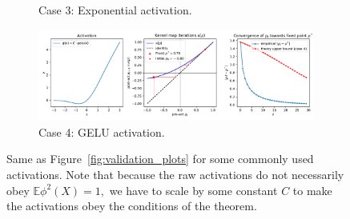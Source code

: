 \documentclass[twoside]{article}
\newcommand{\E}{\mathbb{E}}
\theoremstyle{definition}
\begin{document}
\begin{figure}[ht!]
\begin{subfigure}[b]{0.7\textwidth}
        \caption{\small Case 3: Exponential activation.} 
    \end{subfigure}
    \hfill
    \begin{subfigure}[b]{0.7\textwidth}
        \centering
        \includegraphics[width=\textwidth]{./kernel_map_convergence_case_3_gelu.pdf}
        \caption{\small Case 4: GELU activation.}
    \end{subfigure}
    \caption{\small Same as Figure~\ref{fig:validation_plots} for some commonly used activations. Note that because the raw activations do not necessarily obey $\E \phi^2(X)=1,$ we have to scale by some constant $C$ to make the activations obey the conditions of the theorem.}
    \label{fig:validation_plots_real_activations}
\end{figure}
\end{document}
